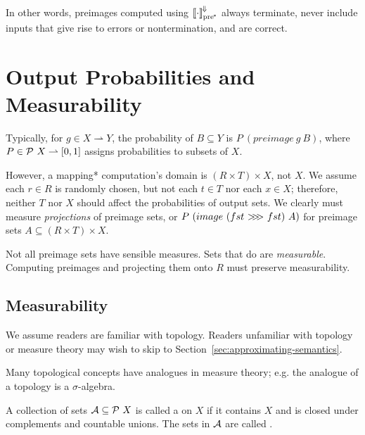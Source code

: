 \documentclass{llncs}
\newcommand{\pto}{\rightharpoonup}
\newcommand{\conv}{^{\mspace{-2mu}\Downarrow\mspace{-2mu}}}
\newcommand{\meaningofconv}[1]{\left\llbracket{#1}\right\rrbracket\conv}
\newcommand{\arrowcomp}{\ensuremath{{>}\mspace{-6mu}{>}\mspace{-6mu}{>}}}
\newcommand{\ppre}{_\mathrm{pre^{\mspace{-2mu}*}}}
\begin{document}
In other words, preimages computed using $\meaningofconv{\cdot}\ppre$ always terminate, never include inputs that give rise to errors or nontermination, and are correct.


\section{Output Probabilities and Measurability}
\label{sec:measurability}

Typically, for $g \in X \pto Y$, the probability of $B \subseteq Y$ is $P~(preimage~g~B)$, where $P \in \powerset~X \pto [0,1]$ assigns probabilities to subsets of $X$.

However, a mapping* computation's domain is $(R \times T) \times X$, not $X$.
We assume each $r \in R$ is randomly chosen, but not each $t \in T$ nor each $x \in X$; therefore, neither $T$ nor $X$ should affect the probabilities of output sets.
We clearly must measure \emph{projections} of preimage sets, or $P~(image~(fst~\arrowcomp~fst)~A)$ for preimage sets $A \subseteq (R \times T) \times X$. 

Not all preimage sets have sensible measures.
Sets that do are \emph{measurable}.
Computing preimages and projecting them onto $R$ must preserve measurability.

\subsection{Measurability}

We assume readers are familiar with topology.
Readers unfamiliar with topology or measure theory may wish to skip to Section~\ref{sec:approximating-semantics}.

Many topological concepts have analogues in measure theory; e.g. the analogue of a topology is a $\sigma$-algebra.

\begin{definition}
A collection of sets $\mathcal{A} \subseteq \mathcal{P}~X$ is called a  on $X$ if it contains $X$ and is closed under complements and countable unions.
The sets in $\mathcal{A}$ are called .
\end{definition}
\end{document}
